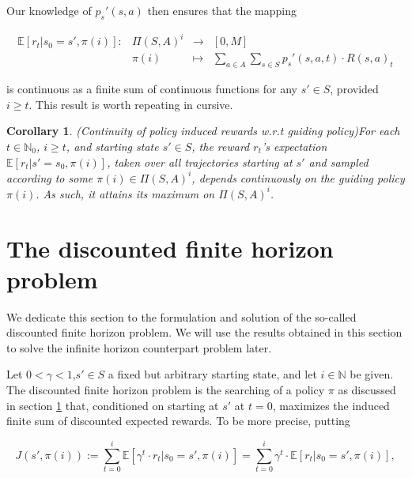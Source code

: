 \documentclass[11pt]{article} %
\newtheorem{cor}{Corollary}
\begin{document}
Our knowledge of $p_s'(s,a)$ then ensures that the mapping

\begin{equation}\label{contExpRewMap}
	\begin{array}{rccl}
		\mathbb{E}[r_t | s_0 = s', \pi(i)]: 	& \Pi(S,A)^i 	& \rightarrow 	& [0,M] \\
									& \pi(i)				 		& \mapsto 	& \sum\limits_{a \in A} \sum\limits_{s \in S} p_s'(s,a,t) \cdot R(s,a)_t
	\end{array}
\end{equation}

is continuous as a finite sum of continuous functions for any $s' \in S$, provided $i \ge t$. This result is worth repeating in cursive.

\begin{cor}{(Continuity of policy induced rewards w.r.t guiding policy)}\label{corContinuousReward}
For each $t \in \mathbb{N}_0$, $i \ge t$, and starting state $s' \in S$, the reward $r_t$'s expectation $\mathbb{E}[r_t | s' = s_0, \pi(i)]$, taken over all trajectories starting at $s'$ and sampled according to some $\pi(i) \in \Pi(S,A)^i$, depends continuously on the guiding policy $\pi(i)$. As such, it attains its maximum on $\Pi(S,A)^i$.
\end{cor}

\section{The discounted finite horizon problem}

We dedicate this section to the formulation and solution of the so-called discounted finite horizon problem. We will use the results obtained in this section to solve the infinite horizon counterpart problem later.

Let $0 < \gamma < 1$,$s' \in S$ a fixed but arbitrary starting state, and let $i \in \mathbb{N}$ be given. The discounted finite horizon problem is the searching of a policy $\pi$ as discussed in section \ref{} that, conditioned on starting at $s'$ at $t=0$, maximizes the induced finite sum of discounted expected rewards. To be more precise, putting

\begin{equation}\label{eqFinDiscHorReward}
		J(s',\pi(i)) := \sum\limits_{t=0}^i \mathbb{E}[ \gamma^t \cdot r_t | s_0 = s', \pi(i)] = \sum\limits_{t=0}^i \gamma^t \cdot \mathbb{E}[ r_t | s_0 = s', \pi(i)],
\end{equation}
\end{document}
